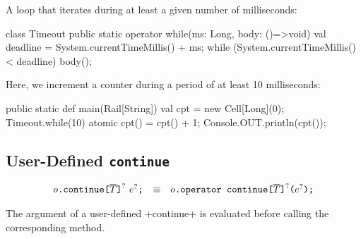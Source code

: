 \begin{ex}
  A loop that iterates during at least a given number of milliseconds:
\begin{xten}
class Timeout {
  public static operator while(ms: Long, body: ()=>void) {
    val deadline = System.currentTimeMillis() + ms;
    while (System.currentTimeMillis() < deadline) {
      body();
    }
  }
}
\end{xten}
%
Here, we increment a counter during a period of at least 10 milliseconds:
\begin{xten}
public static def main(Rail[String]) {
  val cpt = new Cell[Long](0);
  Timeout.while(10) {
    atomic { cpt() = cpt() + 1; }
  }
  Console.OUT.println(cpt());
}
\end{xten}

\end{ex}

\subsection{User-Defined  \texttt{continue}}

$$
\begin{array}{rcl}
  {o}\texttt{.continue}\texttt{[}{\overline{T}}\texttt{]}^?~{e}^?\texttt{;}
  & \equiv &
  {o}\texttt{.operator continue}\texttt{[}{\overline{T}}\texttt{]}^?\texttt{(}{e}^?\texttt{);}
\end{array}
$$

The argument of a user-defined \xcd+continue+ is evaluated before
calling the corresponding method.

